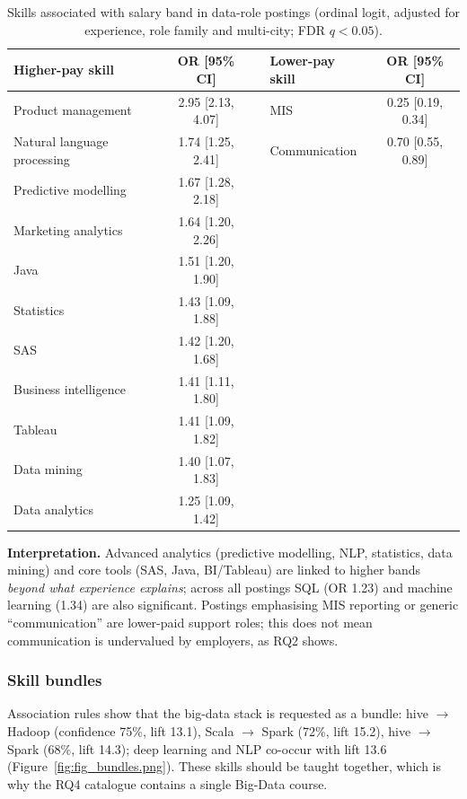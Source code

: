 \begin{table}[H]\centering\small
\caption{Skills associated with salary band in data-role postings (ordinal logit, adjusted for
experience, role family and multi-city; FDR $q<0.05$).}\label{tab:pay}
\begin{tabular}{@{}l c c l c@{}}
\toprule
Higher-pay skill & OR [95\% CI] & & Lower-pay skill & OR [95\% CI]\\
\midrule
Product management & 2.95 [2.13, 4.07] & & MIS & 0.25 [0.19, 0.34]\\
Natural language processing & 1.74 [1.25, 2.41] & & Communication & 0.70 [0.55, 0.89]\\
Predictive modelling & 1.67 [1.28, 2.18] & & & \\
Marketing analytics & 1.64 [1.20, 2.26] & & & \\
Java & 1.51 [1.20, 1.90] & & & \\
Statistics & 1.43 [1.09, 1.88] & & & \\
SAS & 1.42 [1.20, 1.68] & & & \\
Business intelligence & 1.41 [1.11, 1.80] & & & \\
Tableau & 1.41 [1.09, 1.82] & & & \\
Data mining & 1.40 [1.07, 1.83] & & & \\
Data analytics & 1.25 [1.09, 1.42] & & & \\
\bottomrule
\end{tabular}
\end{table}


\textbf{Interpretation.} Advanced analytics (predictive modelling, NLP, statistics, data mining)
and core tools (SAS, Java, BI/Tableau) are linked to higher bands \emph{beyond what experience
explains}; across all postings SQL (OR 1.23) and machine learning (1.34) are also significant.
Postings emphasising MIS reporting or generic ``communication'' are lower-paid support roles; this
does not mean communication is undervalued by employers, as RQ2 shows.

\subsubsection{Skill bundles}

Association rules show that the big-data stack is requested as a bundle: hive $\rightarrow$ Hadoop
(confidence 75\%, lift 13.1), Scala $\rightarrow$ Spark (72\%, lift 15.2), hive $\rightarrow$ Spark
(68\%, lift 14.3); deep learning and NLP co-occur with lift 13.6 (Figure~\ref{fig:fig_bundles.png}).
These skills should be taught together, which is why the RQ4 catalogue contains a single Big-Data
course.

